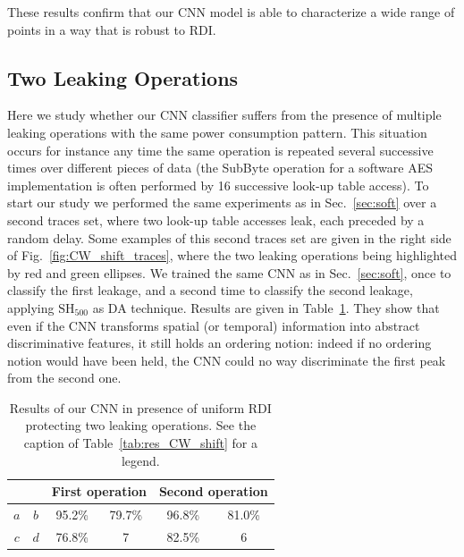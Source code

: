 These results confirm that our CNN model is able to characterize a wide range of points in a way that is robust to RDI. 

\subsection{Two Leaking Operations}
Here we study whether our CNN classifier suffers from the presence of multiple leaking operations with the same power consumption pattern. This situation occurs for instance any time the same operation is repeated several successive times over different pieces of data (\eg the SubByte operation for a software AES implementation is often performed by 16 successive look-up table access). To start our study we performed the same experiments as in Sec.~\ref{sec:soft} over a second traces set, where two look-up table accesses leak, each preceded by a random delay. Some examples of this second traces set are given in the right side of Fig.~\ref{fig:CW_shift_traces}, where the two leaking operations being highlighted by red and green ellipses. We trained the same CNN as in Sec.~\ref{sec:soft}, once to classify the first leakage, and a second time to classify the second leakage, applying $\mathrm{SH}_{500}$ as DA technique. Results are given in Table~\ref{tab:label}. They show that even if the CNN transforms spatial (or temporal) information into abstract discriminative features, it still holds an ordering notion: indeed if no ordering notion would have been held, the CNN could no way discriminate the first peak from the second one. 


\begin{table}[]
\centering
\caption{Results of our CNN in presence of uniform RDI protecting two leaking operations. See the caption of Table~\ref{tab:res_CW_shift} for a legend.}
\label{tab:label}
\begin{tabular}{|c|c|c|c|c|c|}
\hline
\multicolumn{2}{|c|}{} & \multicolumn{2}{c|}{First operation} & \multicolumn{2}{c|}{Second operation} \\ \hline
$a$        & $b$       & 95.2\%            & 79.7\%           & 96.8\%            & 81.0\%            \\ \hline
$c$        & $d$       & 76.8\%            & 7                & 82.5\%            & 6                 \\ \hline
\end{tabular}
\end{table}




